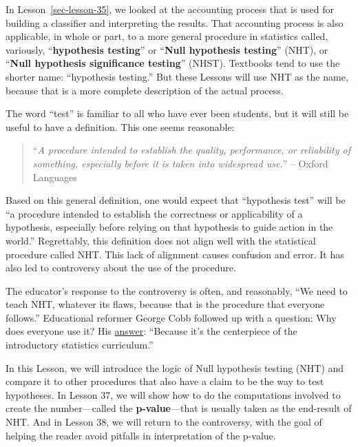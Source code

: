 \documentclass[
  letterpaper,
  DIV=11,
  numbers=noendperiod,
  oneside]{scrreprt}
\newcommand{\Ptest}{\mathbb{P}}
\newcommand{\Ntest}{\mathbb{N}}
\newcommand{\given}{\ |\!\!|\  }
\begin{document}
\[\newcommand{\Ptest}{\mathbb{P}}
\newcommand{\Ntest}{\mathbb{N}}
\newcommand{\given}{\ |\!\!|\  }\]

In Lesson~\ref{sec-lesson-35}, we looked at the accounting process that
is used for building a classifier and interpreting the results. That
accounting process is also applicable, in whole or part, to a more
general procedure in statistics called, variously, ``\textbf{hypothesis
testing}'' or ``\textbf{Null hypothesis testing}'' (NHT), or
``\textbf{Null hypothesis significance testing}'' (NHST). Textbooks tend
to use the shorter name: ``hypothesis testing.'' But these Lessons will
use NHT as the name, because that is a more complete description of the
actual process.

The word ``test'' is familiar to all who have ever been students, but it
will still be useful to have a definition. This one seems reasonable:

\begin{quote}
``\emph{A procedure intended to establish the quality, performance, or
reliability of something, especially before it is taken into widespread
use.}'' -- Oxford Languages
\end{quote}

Based on this general definition, one would expect that ``hypothesis
test'' will be ``a procedure intended to establish the correctness or
applicability of a hypothesis, especially before relying on that
hypothesis to guide action in the world.'' Regrettably, this definition
does not align well with the statistical procedure called NHT. This lack
of alignment causes confusion and error. It has also led to controversy
about the use of the procedure.

The educator's response to the controversy is often, and reasonably,
``We need to teach NHT, whatever its flaws, because that is the
procedure that everyone follows.'' Educational reformer George Cobb
followed up with a question: Why does everyone use it? His
\href{https://escholarship.org/uc/item/6hb3k0nz}{answer}: ``Because it's
the centerpiece of the introductory statistics curriculum.''

In this Lesson, we will introduce the logic of Null hypothesis testing
(NHT) and compare it to other procedures that also have a claim to be
the way to test hypotheses. In Lesson 37, we will show how to do the
computations involved to create the number---called the
\textbf{p-value}---that is usually taken as the end-result of NHT. And
in Lesson 38, we will return to the controversy, with the goal of
helping the reader avoid pitfalls in interpretation of the p-value.
\end{document}
